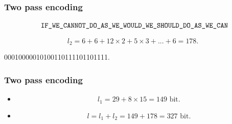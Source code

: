 \documentclass[14pt]{beamer}
\begin{document}
\begin{frame}
\frametitle{Two pass encoding}
\begin{itemize}    
\footnotesize {

    \item 
    \begin{equation}
    \label{ex2pass} {\texttt{
    IF{\_}WE{\_}CANNOT{\_}DO{\_}AS{\_}WE{\_}WOULD{\_}WE{\_}SHOULD{\_}DO{\_}AS{\_}WE{\_}CAN} }\\
    \end{equation}
}
    \item 
    \[
    l_2 = 6 + 6 + 12\times 2 + 5\times 3 + ... + 6 = 178.
    \]
    
    \item 
    \begin{center}
    00010000010100110111101101111.
    \end{center}

\end{itemize}
\end{frame}
    

\begin{frame}
\frametitle{Two pass encoding}
\begin{itemize}    
    
    \item 
    \[
    l_1 = 29 + 8\times 15 = 149\text{~bit}.
    \]
    
    \item 
    \begin{equation}
    \label{eq3_15} l = l_1 + l_2 = 149 + 178 = 327\text{~bit}.
    \end{equation}
   
\end{itemize}
\end{frame}
\end{document}
